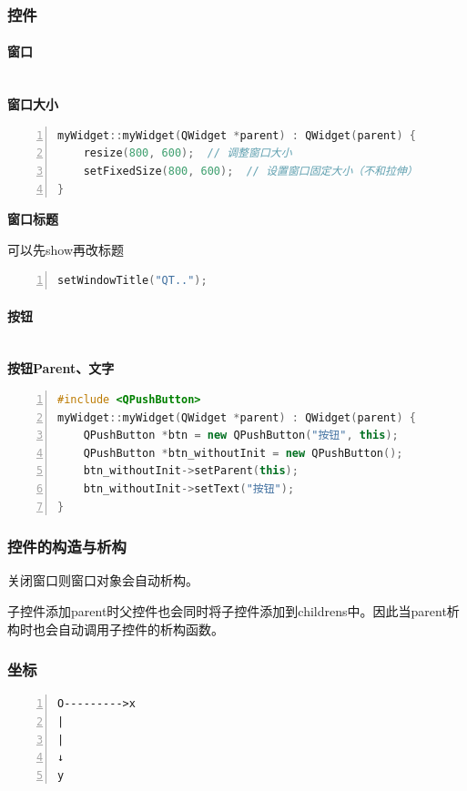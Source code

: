 \documentclass[cs4size,a4paper]{ctexart}
\newcommand{\subsubsubsection}[1]{\paragraph{#1}\mbox{}\\}
\numberwithin{equation}{section}
\numberwithin{table}{section}
\numberwithin{figure}{section}
\begin{document}
\subsubsection{控件}

\subsubsubsection{窗口}

\textbf{窗口大小}

\begin{lstlisting}[language={c++},
    numbers=left,
    numberstyle=\tiny\monaco,
    basicstyle=\footnotesize\monaco]
myWidget::myWidget(QWidget *parent) : QWidget(parent) {
    resize(800, 600);  // 调整窗口大小
    setFixedSize(800, 600);  // 设置窗口固定大小（不和拉伸）
}
\end{lstlisting}

\textbf{窗口标题}

可以先show再改标题

\begin{lstlisting}[language={c++},
    numbers=left,
    numberstyle=\tiny\monaco,
    basicstyle=\footnotesize\monaco]
setWindowTitle("QT..");
\end{lstlisting}

\subsubsubsection{按钮}

\textbf{按钮Parent、文字}


\begin{lstlisting}[language={c++},
    numbers=left,
    numberstyle=\tiny\monaco,
    basicstyle=\footnotesize\monaco]
#include <QPushButton>
myWidget::myWidget(QWidget *parent) : QWidget(parent) {
    QPushButton *btn = new QPushButton("按钮", this);
    QPushButton *btn_withoutInit = new QPushButton();
    btn_withoutInit->setParent(this);
    btn_withoutInit->setText("按钮");
}
\end{lstlisting}

\subsubsection{控件的构造与析构}

关闭窗口则窗口对象会自动析构。

子控件添加parent时父控件也会同时将子控件添加到childrens中。因此当parent析构时也会自动调用子控件的析构函数。

\subsubsection{坐标}

\begin{lstlisting}[numbers=left,
    numberstyle=\tiny\monaco,
    basicstyle=\footnotesize\monaco]
O--------->x
|
|
↓
y
\end{lstlisting}
\end{document}
